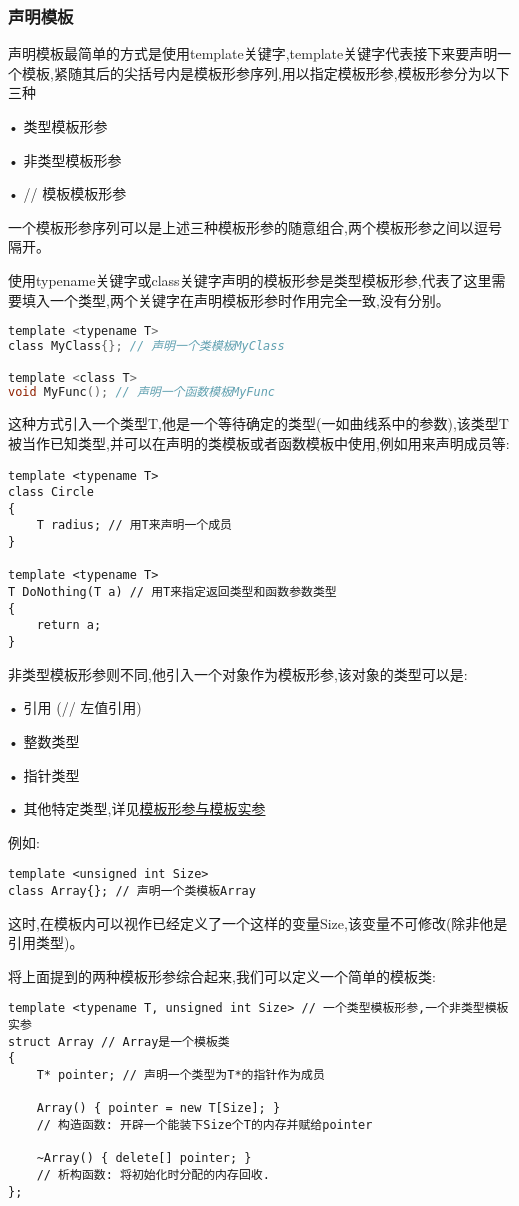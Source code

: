 \documentclass[UTF8]{ctexart}
\begin{document}
\subsubsection{声明模板}
声明模板最简单的方式是使用template关键字,template关键字代表接下来要声明一个模板,紧随其后的尖括号内是模板形参序列,用以指定模板形参,模板形参分为以下三种

• 类型模板形参

• 非类型模板形参

• // 模板模板形参

一个模板形参序列可以是上述三种模板形参的随意组合,两个模板形参之间以逗号隔开。

使用typename关键字或class关键字声明的模板形参是类型模板形参,代表了这里需要填入一个类型,两个关键字在声明模板形参时作用完全一致,没有分别。
\begin{lstlisting}[language = C,basicstyle=\small\ttfamily]
template <typename T>
class MyClass{}; // 声明一个类模板MyClass

template <class T>
void MyFunc(); // 声明一个函数模板MyFunc
\end{lstlisting}

这种方式引入一个类型T,他是一个等待确定的类型(一如曲线系中的参数),该类型T被当作已知类型,并可以在声明的类模板或者函数模板中使用,例如用来声明成员等:
\begin{lstlisting}
template <typename T>
class Circle
{
    T radius; // 用T来声明一个成员
}

template <typename T>
T DoNothing(T a) // 用T来指定返回类型和函数参数类型
{
    return a; 
}
\end{lstlisting}

非类型模板形参则不同,他引入一个对象作为模板形参,该对象的类型可以是:

• 引用 (// 左值引用)

• 整数类型

• 指针类型

• 其他特定类型,详见\href{https://zh.cppreference.com/w/cpp/language/template_parameters}{模板形参与模板实参}

例如:
\begin{lstlisting}
template <unsigned int Size>
class Array{}; // 声明一个类模板Array
\end{lstlisting}

这时,在模板内可以视作已经定义了一个这样的变量Size,该变量不可修改(除非他是引用类型)。

将上面提到的两种模板形参综合起来,我们可以定义一个简单的模板类:
\begin{lstlisting}
template <typename T, unsigned int Size> // 一个类型模板形参,一个非类型模板实参
struct Array // Array是一个模板类
{
    T* pointer; // 声明一个类型为T*的指针作为成员

    Array() { pointer = new T[Size]; } 
    // 构造函数: 开辟一个能装下Size个T的内存并赋给pointer
    
    ~Array() { delete[] pointer; }
    // 析构函数: 将初始化时分配的内存回收.
};
\end{lstlisting}
\end{document}
